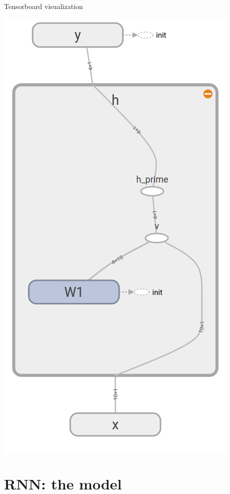 \documentclass[10pt]{beamer}
\begin{document}
\begin{frame}[fragile]{Tensorboard visualization}
\begin{center}
\includegraphics[scale=0.26]{images/abstract_tf_graph2.png}
\end{center}
\end{frame}


\section{RNN: the model}
\end{document}
